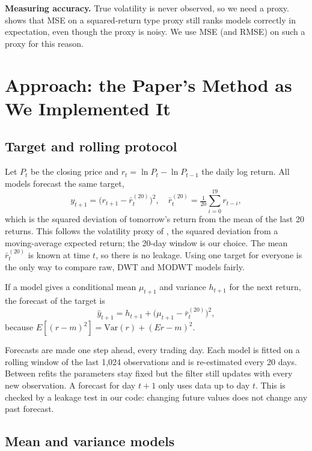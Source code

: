 \documentclass{article}
\begin{document}
\textbf{Measuring accuracy.} True volatility is never observed, so we need a proxy. \citet{patton2011} shows that MSE on a squared-return type proxy still ranks models correctly in expectation, even though the proxy is noisy. We use MSE (and RMSE) on such a proxy for this reason.

\section{Approach: the Paper's Method as We Implemented It}
\label{sec:approach}

\subsection{Target and rolling protocol}

Let $P_t$ be the closing price and $r_t=\ln P_t-\ln P_{t-1}$ the daily log return. All models forecast the same target,
\begin{equation}
y_{t+1}=\bigl(r_{t+1}-\bar r_{t}^{(20)}\bigr)^2,\quad \bar r_t^{(20)}=\tfrac{1}{20}\textstyle\sum_{i=0}^{19}r_{t-i},
\label{eq:target}
\end{equation}
which is the squared deviation of tomorrow's return from the mean of the last 20 returns. This follows the volatility proxy of \citet{ismail2016}, the squared deviation from a moving-average expected return; the 20-day window is our choice. The mean $\bar r_t^{(20)}$ is known at time $t$, so there is no leakage. Using one target for everyone is the only way to compare raw, DWT and MODWT models fairly.

If a model gives a conditional mean $\mu_{t+1}$ and variance $h_{t+1}$ for the next return, the forecast of the target is
\begin{equation}
\hat y_{t+1}=h_{t+1}+\bigl(\mu_{t+1}-\bar r_t^{(20)}\bigr)^2 ,
\label{eq:restore}
\end{equation}
because $E[(r-m)^2]=\mathrm{Var}(r)+(E r-m)^2$.

Forecasts are made one step ahead, every trading day. Each model is fitted on a rolling window of the last 1,024 observations and is re-estimated every 20 days. Between refits the parameters stay fixed but the filter still updates with every new observation. A forecast for day $t+1$ only uses data up to day $t$. This is checked by a leakage test in our code: changing future values does not change any past forecast.

\subsection{Mean and variance models}
\end{document}
